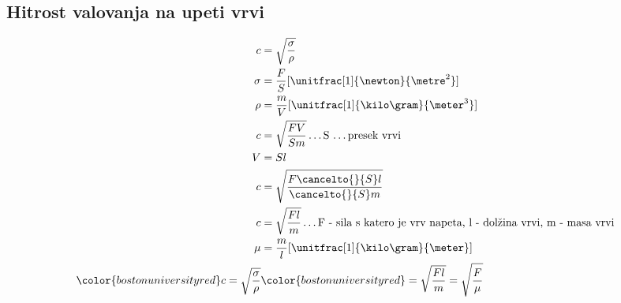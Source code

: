{\color{indiagreen}\subsection{Hitrost valovanja na upeti vrvi}}
\begin{align*}
	c &= \sqrt{\frac{\sigma}{\rho}}\\
	\sigma &= \frac{F}{S} [\unitfrac[1]{\newton}{\metre^2}]\\
	\rho &= \frac{m}{V} [\unitfrac[1]{\kilo\gram}{\meter^3}]\\
	c &= \sqrt{\frac{FV}{Sm}} \dots \text{S \dots presek vrvi}\\
	V &= Sl\\
	c &= \sqrt{\frac{F \cancelto{}{S} l}{\cancelto{}{S}m}}\\
	c &= \sqrt{\frac{Fl}{m}} \dots \text{F - sila s katero je vrv napeta, l - dolžina vrvi, m - masa vrvi}\\
	\mu &= \frac{m}{l}[\unitfrac[1]{\kilo\gram}{\meter}]\\
	{\color{bostonuniversityred}c = \sqrt{\frac{\sigma}{\rho}}} &{\color{bostonuniversityred}= \sqrt{\frac{Fl}{m}} = \sqrt{\frac{F}{\mu}}}\\
\end{align*}

\\